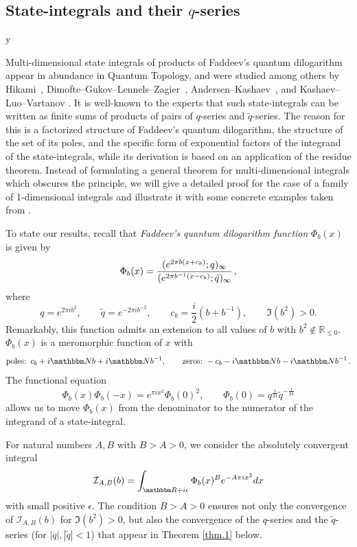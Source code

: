 \documentclass[12pt]{amsart}
\theoremstyle{definition}
\def\printname#1{
        \if\draft y
                \smash{\makebox[0pt]{\hspace{-0.5in}
                        \raisebox{8pt}{\tt\tiny #1}}}
        \fi
}
\def\lbl#1{\label{#1}\printname{#1}}
\def\BN{\mathbbm N}
\def\BR{\mathbbm R}
\def\calI{\mathcal I}
\def\tq{\tilde{q}}
\begin{document}
\subsection{State-integrals and their $q$-series}
\lbl{sub.intro}

Multi-dimensional state integrals of products of Faddeev's quantum 
dilogarithm appear in abundance in Quantum Topology, and were studied among 
others by Hikami~\cite{Hi}, Dimofte--Gukov--Lennels--Zagier~\cite{DGLZ}, Andersen--Kashaev~\cite{AK}, and 
Kashaev--Luo--Vartanov \cite{KLV}. It is well-known to the experts 
that such state-integrals can be written as finite sums of products of pairs 
of $q$-series and $\tq$-series. The reason for this is a factorized structure 
of Faddeev's quantum dilogarithm, the structure of the set of its poles, 
and the specific form of exponential factors of the integrand of the 
state-integrals, while its derivation is based on an application of the 
residue theorem. Instead of formulating a general theorem for 
multi-dimensional integrals which obscures the principle, we will give a 
detailed proof for the case of a family of 1-dimensional integrals 
and illustrate it with some concrete examples taken from \cite{AK,KLV}. 

To state our results, recall that
{\em Faddeev's quantum dilogarithm function} $\Phi_b(x)$ is given by 
\cite{Faddeev}
\begin{equation}\lbl{fad}
\Phi_b(x)
=\frac{(e^{2 \pi b (x+c_b)};q)_\infty}{
(e^{2 \pi b^{-1} (x-c_b)};\tq)_\infty} \,,
\end{equation}
where
$$
q=e^{2 \pi i b^2}, \qquad 
\tq=e^{-2 \pi i b^{-2}}, \qquad
c_b=\frac{i}{2}(b+b^{-1}), \qquad \Im(b^2) >0. 
$$
Remarkably, this function admits an extension to all values of $b$ with 
$b^2\not\in\mathbb{R}_{\le 0}$. $\Phi_b(x)$ is a meromorphic function of $x$ with
$$
\text{poles:} \,\,\, c_b + i \BN b + i \BN b^{-1},
\qquad
\text{zeros:} \,\, -c_b - i \BN b - i \BN b^{-1} \,.
$$ 
The functional equation
$$
\Phi_b(x) \Phi_b(-x)=e^{\pi i x^2} \Phi_b(0)^2, 
\qquad
\Phi_b(0)=q^{\frac{1}{24}} \tq^{-\frac{1}{24}}
$$
allows us to move $\Phi_b(x)$ from the denominator to the numerator
of the integrand of a state-integral. 

For natural numbers $A,B$ with 
$B > A > 0$, we consider the absolutely convergent integral 
$$
\calI_{A,B}(b)=\int_{\BR + i \epsilon} \Phi_b(x)^B e^{-A \pi i x^2} dx
$$
with small positive $\epsilon$. The condition $B > A > 0$ ensures not only 
the convergence
of $\calI_{A,B}(b)$ for $\Im(b^2) >0$, but also the convergence of the 
$q$-series and the $\tq$-series (for $|q|, |\tq|<1$) that appear in 
Theorem \ref{thm.1} below.
\end{document}
